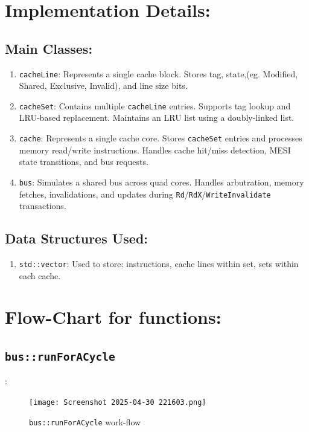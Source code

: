 \documentclass{article}
\begin{document}
\section{Implementation Details:}
\subsection{Main Classes:}
\begin{enumerate}
    \item \texttt{cacheLine}: Represents a single cache block. Stores tag, state,(eg. Modified, Shared, Exclusive, Invalid), and line size bits.
    \item \texttt{cacheSet}: Contains multiple \texttt{cacheLine} entries. Supports tag lookup and LRU-based replacement. Maintains an LRU list using a doubly-linked list.
    \item \texttt{cache}: Represents a single cache core. Stores \texttt{cacheSet} entries and processes memory read/write instructions. Handles cache hit/miss detection, MESI  state transitions, and bus requests.
    \item \texttt{bus}: Simulates a shared bus across quad cores. Handles arbutration, memory fetches, invalidations, and updates during \texttt{Rd}/\texttt{RdX}/\texttt{WriteInvalidate} transactions.
\end{enumerate}






\subsection{Data Structures Used:}
\begin{enumerate}
    \item \texttt{std::vector}: Used to store: instructions, cache lines within set, sets within each cache.
\end{enumerate}




\section{Flow-Chart for functions:}
\subsection{\texttt{bus::runForACycle}} : 
\begin{figure}[h]
  \centering
  \texttt{[image: Screenshot 2025-04-30 221603.png]}
  \caption{\texttt{bus::runForACycle} work-flow}
  \label{fig:arch}
\end{figure}
\end{document}
